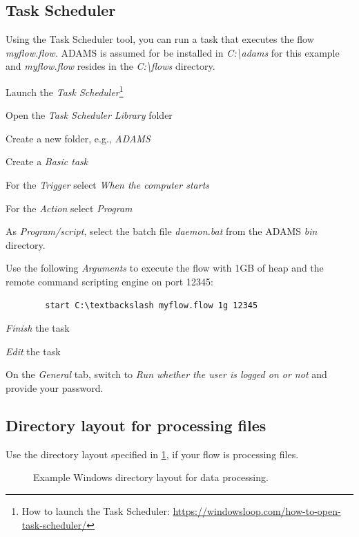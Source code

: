 \subsection{Task Scheduler}
Using the Task Scheduler\cite{taskschd} tool, you can run a task that executes the flow \textit{myflow.flow}.
ADAMS is assumed for be installed in \textit{C:\textbackslash adams} for this
example and \textit{myflow.flow} resides in the \textit{C:\textbackslash flows}
directory.

\begin{tight_itemize}
    \item Launch the \textit{Task Scheduler}\footnote{How to launch the Task Scheduler: \url{https://windowsloop.com/how-to-open-task-scheduler/}{}}
    \item Open the \textit{Task Scheduler Library} folder
    \item Create a new folder, e.g., \textit{ADAMS}
    \item Create a \textit{Basic task}
    \item For the \textit{Trigger} select \textit{When the computer starts}
    \item For the \textit{Action} select \textit{Program}
    \item As \textit{Program/script}, select the batch file \textit{daemon.bat}
    from the ADAMS \textit{bin} directory.
    \item Use the following \textit{Arguments} to execute the flow with 1GB of
      heap and the remote command scripting engine on port 12345:
        \begin{verbatim}
        start C:\textbackslash myflow.flow 1g 12345
        \end{verbatim}
    \item \textit{Finish} the task
    \item \textit{Edit} the task
    \item On the \textit{General} tab, switch to \textit{Run whether the user is logged on or not}
    and provide your password.
\end{tight_itemize}

\clearpage
\subsection{Directory layout for processing files}
Use the directory layout specified in \ref{example_windows_dir_layout_data_processing},
if your flow is processing files.
\begin{figure}[htb]
  \caption{Example Windows directory layout for data processing.}
  \label{example_windows_dir_layout_data_processing}
\end{figure}


